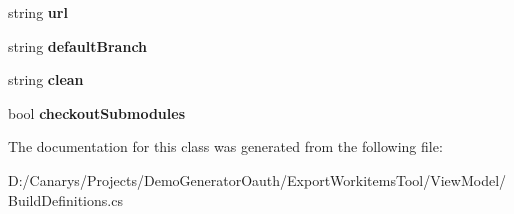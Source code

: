 \begin{DoxyCompactItemize}
\item 
\mbox{\label{class_templates_generator_tool_1_1_view_model_1_1_build_definitions_1_1_repository_a544d750a3030c4596bbc40baccc10d3b}} 
string {\bfseries url}
\item 
\mbox{\label{class_templates_generator_tool_1_1_view_model_1_1_build_definitions_1_1_repository_abae4f1c913b23181c25d462283dce7a8}} 
string {\bfseries default\+Branch}
\item 
\mbox{\label{class_templates_generator_tool_1_1_view_model_1_1_build_definitions_1_1_repository_a0071ac21af8b115584f2c017a42a9e37}} 
string {\bfseries clean}
\item 
\mbox{\label{class_templates_generator_tool_1_1_view_model_1_1_build_definitions_1_1_repository_a3b7e0af0fd642a3fdf26d19eebc3586d}} 
bool {\bfseries checkout\+Submodules}
\end{DoxyCompactItemize}


The documentation for this class was generated from the following file\+:\begin{DoxyCompactItemize}
\item 
D\+:/\+Canarys/\+Projects/\+Demo\+Generator\+Oauth/\+Export\+Workitems\+Tool/\+View\+Model/Build\+Definitions.\+cs\end{DoxyCompactItemize}
